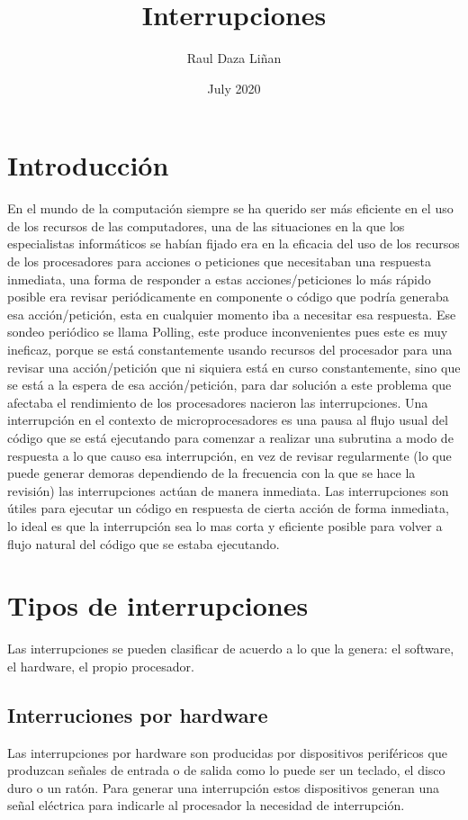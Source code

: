 \documentclass[letterpaper, 12pt]{article}
\title{Interrupciones}
\author{Raul Daza Liñan }
\date{July 2020}
\begin{document}
\maketitle

\section{Introducción}
En el mundo de la computación siempre se ha querido ser más eficiente en el uso de los recursos de las computadores, una de las situaciones en la que los especialistas informáticos se habían fijado era en la eficacia del uso de los recursos de los procesadores para acciones o peticiones que necesitaban una respuesta inmediata, una forma de responder a estas acciones/peticiones lo más rápido posible era revisar periódicamente en componente o código que podría generaba esa acción/petición, esta en cualquier momento iba a necesitar esa respuesta. Ese sondeo periódico se llama Polling, este produce inconvenientes pues este es muy ineficaz, porque se está constantemente usando recursos del procesador para una revisar una acción/petición que ni siquiera está en curso constantemente, sino que se está a la espera de esa acción/petición, para dar solución a este problema que afectaba el rendimiento de los procesadores nacieron las interrupciones. Una interrupción en el contexto de microprocesadores es una pausa al flujo usual del código que se está ejecutando para comenzar a realizar una subrutina a modo de respuesta a lo que causo esa interrupción, en vez de revisar regularmente (lo que puede generar demoras dependiendo de la frecuencia con la que se hace la revisión) las interrupciones actúan de manera inmediata. Las interrupciones son útiles para ejecutar un código en respuesta de cierta acción de forma inmediata, lo ideal es que la interrupción sea lo mas corta y eficiente posible para volver a flujo natural del código que se estaba ejecutando.
\section{Tipos de interrupciones}
Las interrupciones se pueden clasificar de acuerdo a lo que la genera: el software, el hardware, el propio procesador.
\subsection{Interruciones por hardware}
Las interrupciones por hardware son producidas por dispositivos periféricos que produzcan señales de entrada o de salida como lo puede ser un teclado, el disco duro o un ratón. Para generar una interrupción estos dispositivos generan una señal eléctrica para indicarle al procesador la necesidad de interrupción.
\end{document}
